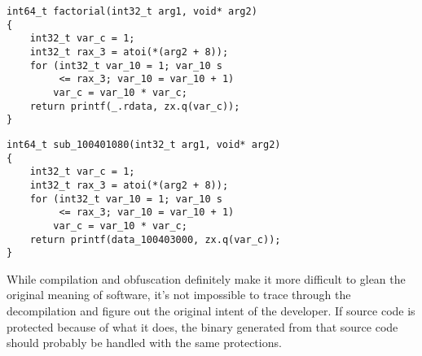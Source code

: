 \begin{minipage}{.45\textwidth}
\begin{lstlisting}[caption={Unstripped Decompilation with Binary Ninja},captionpos=b,style=CStyle,basicstyle=\scriptsize,label={lst:20210802:ninja}]
int64_t factorial(int32_t arg1, void* arg2)
{
	int32_t var_c = 1;
	int32_t rax_3 = atoi(*(arg2 + 8));
	for (int32_t var_10 = 1; var_10 s
	     <= rax_3; var_10 = var_10 + 1)
		var_c = var_10 * var_c;
	return printf(_.rdata, zx.q(var_c));
}
\end{lstlisting}
\end{minipage}
\begin{minipage}{.45\textwidth}
\begin{lstlisting}[caption={Stripped Decompilation with Binary Ninja},captionpos=b,style=CStyle,basicstyle=\scriptsize,label={lst:20210802:ninja2}]
int64_t sub_100401080(int32_t arg1, void* arg2)
{
	int32_t var_c = 1;
	int32_t rax_3 = atoi(*(arg2 + 8));
	for (int32_t var_10 = 1; var_10 s
	     <= rax_3; var_10 = var_10 + 1)
		var_c = var_10 * var_c;
	return printf(data_100403000, zx.q(var_c));
}
\end{lstlisting}
\end{minipage}

While compilation and obfuscation definitely make it more difficult to glean the original meaning of software, it's not impossible to trace through the decompilation and figure out the original intent of the developer. If source code is protected because of what it does, the binary generated from that source code should probably be handled with the same protections.
